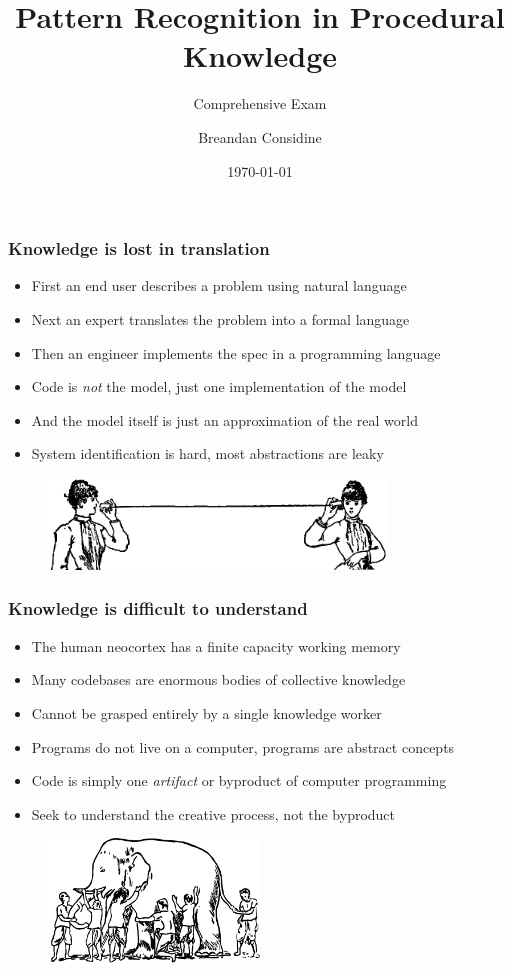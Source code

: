 \documentclass{beamer}
\title{Pattern Recognition in Procedural Knowledge}
\subtitle{Comprehensive Exam}
\author{Breandan Considine}
\institute[McGill]{
McGill University \\
\medskip
\textit{breandan.considine@mcgill.ca}
}
\date{\today}
\begin{document}
  \begin{frame}
    \titlepage
  \end{frame}

  \begin{frame}
    \frametitle{Knowledge is lost in translation}
    \begin{itemize}
      \item First an end user describes a problem using natural language
      \item Next an expert translates the problem into a formal language
      \item Then an engineer implements the spec in a programming language
      \item Code is \textit{not} the model, just one implementation of the model
      \item And the model itself is just an approximation of the real world
      \item System identification is hard, most abstractions are leaky
    \end{itemize}
    \begin{figure}[H]
      \centering
      \includegraphics[width=0.8\textwidth]{../clipart/tincan.jpg}
    \end{figure}
  \end{frame}

  \begin{frame}
    \frametitle{Knowledge is difficult to understand}
    \begin{itemize}
      \item The human neocortex has a finite capacity working memory
      \item Many codebases are enormous bodies of collective knowledge
      \item Cannot be grasped entirely by a single knowledge worker
      \item Programs do not live on a computer, programs are abstract concepts
      \item Code is simply one \textit{artifact} or byproduct of computer programming
      \item Seek to understand the creative process, not the byproduct
    \end{itemize}
    \begin{figure}[H]
      \centering
      \includegraphics[width=0.5\textwidth]{../clipart/elephant.png}
    \end{figure}
  \end{frame}
\end{document}

